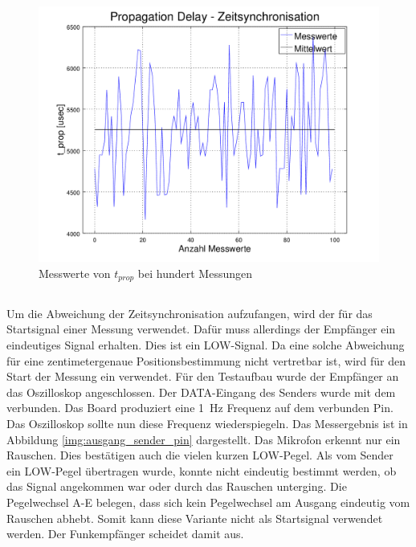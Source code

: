 \begin{figure}[H]
        \centering
        \hspace*{-1.7cm}
        \includegraphics[width=1.2\textwidth]{images/t_prop_zeit_sync_figure.png}
        \caption{Messwerte von $t_{prop}$ bei hundert Messungen}
        \label{img:zeit_sync_t_prop_figure}
\end{figure}


\subsection{\funkempfaenger}
Um die Abweichung der Zeitsynchronisation aufzufangen, wird der \funkempfaenger \platz für das Startsignal einer Messung verwendet. Dafür muss allerdings der Empfänger ein eindeutiges Signal erhalten. Dies ist ein \si{LOW}-Signal. Da eine solche Abweichung für eine zentimetergenaue Positionsbestimmung nicht vertretbar ist, wird für den Start der Messung ein \funkempfaenger \platz verwendet. Für den Testaufbau wurde der Empfänger an das Oszilloskop angeschlossen. Der \si{DATA}-Eingang des Senders wurde mit dem \board \platz verbunden. Das Board produziert eine \SI{1}{\hertz} Frequenz auf dem verbunden Pin. Das Oszilloskop sollte nun diese Frequenz wiederspiegeln. Das Messergebnis ist in Abbildung \ref{img:ausgang_sender_pin} dargestellt. Das Mikrofon erkennt nur ein Rauschen. Dies bestätigen auch die vielen kurzen \si{LOW}-Pegel. Als vom Sender ein \si{LOW}-Pegel übertragen wurde, konnte nicht eindeutig bestimmt werden, ob das Signal angekommen war oder durch das Rauschen unterging. Die Pegelwechsel A-E belegen, dass sich kein Pegelwechsel am Ausgang eindeutig vom Rauschen abhebt. Somit kann diese Variante nicht als Startsignal verwendet werden. Der Funkempfänger scheidet damit aus.

